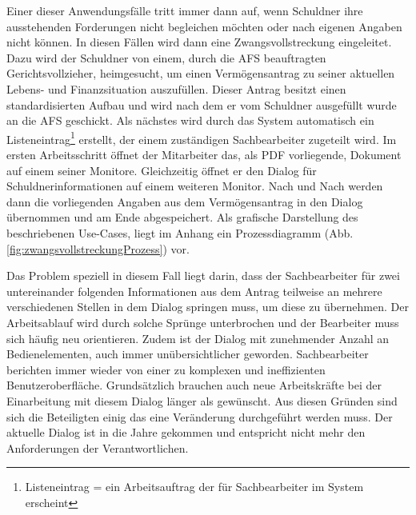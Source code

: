 Einer dieser Anwendungsfälle tritt immer dann auf, wenn Schuldner ihre ausstehenden Forderungen nicht begleichen möchten oder nach eigenen Angaben nicht können. In diesen Fällen wird dann eine Zwangsvollstreckung eingeleitet. Dazu wird der Schuldner von einem, durch die \gls{AFS} beauftragten Gerichtsvollzieher, heimgesucht, um einen Vermögensantrag zu seiner aktuellen Lebens- und Finanzsituation auszufüllen. Dieser Antrag besitzt einen standardisierten Aufbau und wird nach dem er vom Schuldner ausgefüllt wurde an die \gls{AFS} geschickt. Als nächstes wird durch das System automatisch ein Listeneintrag\footnote{Listeneintrag = ein Arbeitsauftrag der für Sachbearbeiter im System erscheint} erstellt, der einem zuständigen Sachbearbeiter zugeteilt wird. Im ersten Arbeitsschritt öffnet der Mitarbeiter das, als PDF vorliegende, Dokument auf einem seiner Monitore. Gleichzeitig öffnet er den Dialog für Schuldnerinformationen auf einem weiteren Monitor. Nach und Nach werden dann die vorliegenden Angaben aus dem Vermögensantrag in den Dialog übernommen und am Ende abgespeichert. Als grafische Darstellung des beschriebenen Use-Cases, liegt im Anhang ein Prozessdiagramm (Abb. \ref{fig:zwangsvollstreckungProzess}) vor.

Das Problem speziell in diesem Fall liegt darin, dass der Sachbearbeiter für zwei untereinander folgenden Informationen aus dem Antrag teilweise an mehrere verschiedenen Stellen in dem Dialog springen muss, um diese zu übernehmen. Der Arbeitsablauf wird durch solche Sprünge unterbrochen und der Bearbeiter muss sich häufig neu orientieren. Zudem ist der Dialog mit zunehmender Anzahl an Bedienelementen, auch immer unübersichtlicher geworden. Sachbearbeiter berichten immer wieder von einer zu komplexen und ineffizienten Benutzeroberfläche. Grundsätzlich brauchen auch neue Arbeitskräfte bei der Einarbeitung mit diesem Dialog länger als gewünscht. Aus diesen Gründen sind sich die Beteiligten einig das eine Veränderung durchgeführt werden muss. Der aktuelle Dialog ist in die Jahre gekommen und entspricht nicht mehr den Anforderungen der Verantwortlichen.


